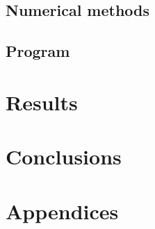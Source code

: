 \documentclass[12pt,a4paper]{article}
\begin{document}
\subsection{Numerical methods}

\subsection{Program}

\section{Results}\label{sec:results}

\section{Conclusions}


\clearpage
\begin{thebibliography}{99}


\end{thebibliography}

\appendix
\section{Appendices}
\end{document}
